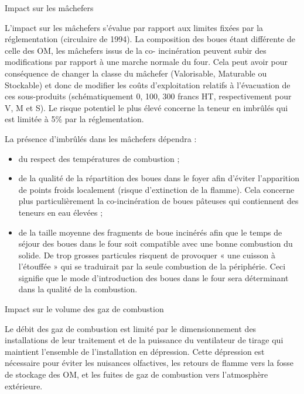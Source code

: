 \vspace{0.3cm}
Impact sur les mâchefers
\vspace{0.3cm}

L’impact sur les mâchefers s’évalue par rapport aux limites fixées par la réglementation (circulaire de 1994).
La composition des boues étant différente de celle des OM, les mâchefers issus de la co-
incinération peuvent subir des modifications par rapport à une marche normale du four. Cela peut avoir pour conséquence de changer la classe du mâchefer (Valorisable, Maturable ou Stockable) et donc de modifier les coûts d’exploitation relatifs à l’évacuation de ces sous-produits (schématiquement 0, 100, 300 francs HT, respectivement pour V, M et S).
Le risque potentiel le plus élevé concerne la teneur en imbrûlés qui est limitée à 5\% par la réglementation.



\vspace{0.3cm}

La présence d'imbrûlés dans les mâchefers dépendra :
\vspace{0.3cm}

\begin{itemize}
\item du respect des températures de combustion ;
\item de la qualité de la répartition des boues dans le foyer afin d’éviter l’apparition de points froids localement (risque d’extinction de la flamme). Cela concerne plus particulièrement la co-incinération de boues pâteuses qui contiennent des teneurs en eau élevées ;
\item  de la taille moyenne des fragments de boue incinérés afin que le temps de séjour des boues dans le four soit compatible avec une bonne combustion du solide. De trop grosses particules risquent de provoquer « une cuisson à l’étouffée » qui se traduirait par la seule combustion de la périphérie.
Ceci signifie que le mode d’introduction des boues dans le four sera déterminant dans la qualité de la combustion. 
\end{itemize}

\vspace{0.3cm}
Impact sur le volume des gaz de combustion
\vspace{0.3cm}

Le débit des gaz de combustion est limité par le dimensionnement des installations de leur traitement et de la puissance du ventilateur de tirage qui maintient l’ensemble de l’installation en dépression. 
Cette dépression est nécessaire pour éviter les nuisances olfactives, les retours de flamme vers la fosse de stockage des OM, et les fuites de gaz de combustion vers l’atmosphère extérieure.


